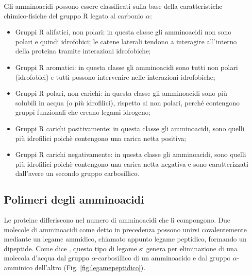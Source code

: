 Gli amminoacidi possono essere classificati sulla base della caratteristiche chimico-fisiche del gruppo R legato al carbonio $\alpha$:
\vspace{10pt}
\begin{itemize}
	\item Gruppi R alifatici, non polari: in questa classe gli amminoacidi non sono polari e quindi idrofobici; le catene laterali tendono a interagire all'interno della proteina tramite interazioni idrofobiche;
	\vspace{5pt}
	\item Gruppi R aromatici: in questa classe gli amminoacidi sono tutti non polari (idrofobici) e tutti possono intervenire nelle interazioni idrofobiche;
	\vspace{5pt}
	\item Gruppi R polari, non carichi: in questa classe gli amminoacidi sono più solubili in acqua (o più idrofilici), rispetto ai non polari, perché contengono gruppi funzionali che creano legami idrogeno;
	\vspace{5pt}
	\item Gruppi R carichi positivamente: in questa classe gli amminoacidi, sono quelli più idrofilici poichè contengono una carica netta positiva;
	\vspace{5pt}
	\item Gruppi R carichi negativamente: in questa classe gli amminoacidi, sono quelli più idrofilici poichè contengono una carica netta negativa e sono caratterizzati dall'avere un secondo gruppo carbosillico.
	\vspace{5pt}
\end{itemize}

\subsection{Polimeri degli amminoacidi}\label{subsec:polimeri}
Le proteine differiscono nel numero di amminoacidi che li compongono. Due molecole di amminoacidi come detto in precedenza possono unirsi covalentemente mediante un legame ammidico, chiamato appunto legame peptidico, formando un dipeptide. Come dice \cite{Principi}, questo tipo di legame si genera per eliminazione di una molecola d'acqua dal gruppo $\alpha$-carbosillico di un amminoacido e dal gruppo $\alpha$-amminico dell'altro (Fig. \ref{fig:legamepeptidico}). 

